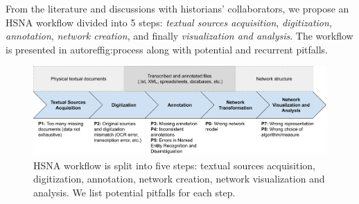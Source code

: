 From the literature and discussions with historians' collaborators, we propose an HSNA workflow divided into 5 steps: \textit{textual sources acquisition}, \textit{digitization}, \textit{annotation}, \textit{network creation}, and finally \textit{visualization and analysis}.
The workflow is presented in autoref{fig:process} along with potential and recurrent pitfalls.

\begin{figure}
    \includegraphics[origin=c, width=\textwidth]{static/figures/HSNAProcess/process.pdf}
 \caption{HSNA workflow is split into five steps: textual sources acquisition, digitization, annotation, network creation, network visualization and analysis. We list potential pitfalls for each step.}
 \label{fig:process}
\end{figure}




